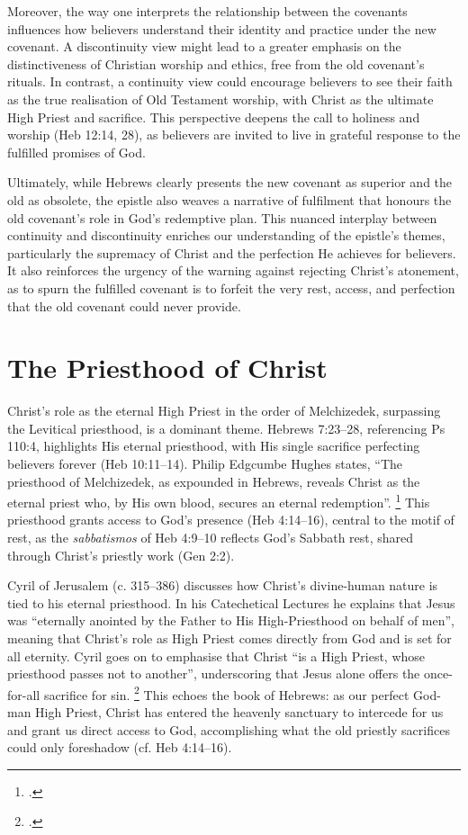 \documentclass[12pt]{article}
\begin{document}
Moreover, the way one interprets the relationship between the covenants
influences how believers understand their identity and practice under the new
covenant. A discontinuity view might lead to a greater emphasis on the
distinctiveness of Christian worship and ethics, free from the old covenant’s
rituals. In contrast, a continuity view could encourage believers to see their
faith as the true realisation of Old Testament worship, with Christ as the
ultimate High Priest and sacrifice. This perspective deepens the call to
holiness and worship (Heb 12:14, 28), as believers are invited to live in
grateful response to the fulfilled promises of God.

Ultimately, while Hebrews clearly presents the new covenant as superior and the
old as obsolete, the epistle also weaves a narrative of fulfilment that honours
the old covenant’s role in God’s redemptive plan. This nuanced interplay between
continuity and discontinuity enriches our understanding of the epistle’s themes,
particularly the supremacy of Christ and the perfection He achieves for
believers. It also reinforces the urgency of the warning against rejecting
Christ’s atonement, as to spurn the fulfilled covenant is to forfeit the very
rest, access, and perfection that the old covenant could never provide.

\section{The Priesthood of Christ}
Christ’s role as the eternal High Priest in the order of Melchizedek, surpassing
the Levitical priesthood, is a dominant theme. Hebrews 7:23--28, referencing Ps
110:4, highlights His eternal priesthood, with His single sacrifice perfecting
believers forever (Heb 10:11--14). Philip Edgcumbe Hughes states, ``The
priesthood of Melchizedek, as expounded in Hebrews, reveals Christ as the
eternal priest who, by His own blood, secures an eternal redemption''.
\footcite[258]{Hughes1977}
This priesthood grants access to God’s presence (Heb 4:14--16),
central to the motif of rest, as the \emph{sabbatismos} of Heb 4:9--10
reflects God’s Sabbath rest, shared through Christ’s priestly work (Gen 2:2).

Cyril of Jerusalem (c. 315–386) discusses how Christ’s divine-human nature is
tied to his eternal priesthood. In his Catechetical Lectures he explains that
Jesus was ``eternally anointed by the Father to His High-Priesthood on behalf of
men'', meaning that Christ’s role as High Priest comes directly from God and is
set for all eternity. Cyril goes on to emphasise that Christ ``is a High Priest,
whose priesthood passes not to another'', underscoring that Jesus alone offers
the once-for-all sacrifice for sin. \footcite[Lecture 12]{Cyril1894}
This echoes the book of Hebrews: as our perfect God-man High Priest, Christ has
entered the heavenly sanctuary to intercede for us and grant us direct access to
God, accomplishing what the old priestly sacrifices could only foreshadow (cf.
Heb 4:14–16).
\end{document}
